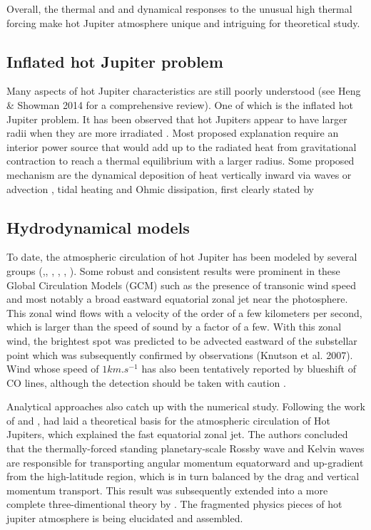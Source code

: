 \documentclass[11pt]{article}
\begin{document}
Overall, the thermal and and dynamical responses to the unusual high thermal forcing make hot Jupiter atmosphere unique and intriguing for theoretical study.

\subsection{Inflated hot Jupiter problem}

Many aspects of hot Jupiter characteristics are still poorly understood (see Heng \& Showman 2014 for a comprehensive review). One of which is the inflated hot Jupiter  problem. It has been observed that hot Jupiters appear to have larger radii when they are more irradiated \citep{baraffe2009physical}. Most proposed explanation require an interior power source that would add up to the radiated heat from gravitational contraction to reach a thermal equilibrium with a larger radius. 
Some proposed mechanism are the dynamical deposition of heat vertically inward via waves or advection \citep{showman2002atmospheric}, tidal heating \citep{bodenheimer2001tidal, bodenheimer2003radii} and Ohmic dissipation, first clearly stated by \citet*{batygin2010inflating}

\subsection{Hydrodynamical models}

To date, the atmospheric circulation of hot Jupiter has been modeled by several groups (\cite{showman2002atmospheric},\cite{showman2008atmospheric}, \cite{dobbs2008atmospheric}, \cite{rauscher2010three}, \cite{heng2011atmospheric}, \cite{fromang2016shear}). Some robust and consistent results were  prominent in these Global Circulation Models (GCM) such as the presence of transonic wind speed and most notably a broad eastward equatorial zonal jet near the photosphere. This zonal wind flows with a velocity of the order of a few kilometers per second, which is larger than the speed of sound by a factor of a few. With this zonal wind, the brightest spot was predicted to be advected eastward of the substellar point \citep{showman2002atmospheric} which was subsequently confirmed by observations (Knutson et al. 2007).  Wind whose speed of $1km.s^ {-1}$ has also been tentatively reported by blueshift of CO lines, although the detection should be taken with caution \citep{snellen2010orbital}. 

Analytical approaches also catch up with the numerical study. Following the work of \citet*{matsuno1966}and \citet*{gill1980}, \citet*{showman2010,showman2011} had laid a theoretical basis for the atmospheric circulation of Hot Jupiters, which explained the fast equatorial zonal jet. The authors concluded that the thermally-forced standing planetary-scale Rossby wave and Kelvin waves are responsible for transporting angular momentum equatorward and up-gradient from the high-latitude region, which is in turn balanced by the drag and vertical momentum transport. This result was subsequently extended into a more complete three-dimentional theory by \citet*{tsai2014}. The fragmented physics pieces of hot jupiter atmosphere is being elucidated and assembled.
\end{document}
